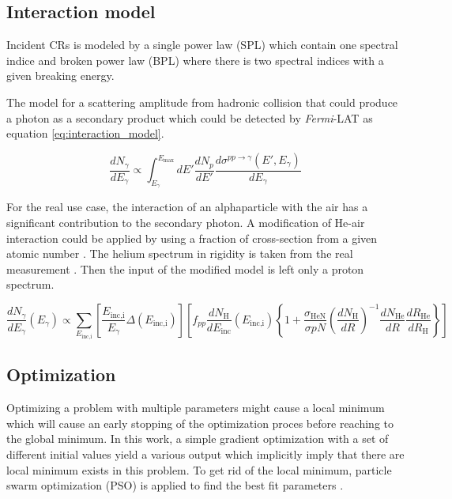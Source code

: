 \subsection{Interaction model}
Incident CRs is modeled by a single power law (SPL) which contain one
spectral indice and broken power law (BPL) where there is two spectral
indices with a given breaking energy.

The model for a scattering amplitude from hadronic collision \cite{K&Omodel}
that could produce a photon as a secondary product which could be
detected by \textit{Fermi}-LAT as equation \ref{eq:interaction_model}.

\begin{equation}
    \frac{dN_\gamma}{dE_\gamma}\propto \int^{E_{\text{max}}}_{E_\gamma} dE'\frac{dN_p}{dE'} \frac{d\sigma^{pp\rightarrow\gamma}(E',E_\gamma)}{dE_\gamma}
    \label{eq:interaction_model}
\end{equation}

For the real use case, the interaction of an alphaparticle with the air
has a significant contribution to the secondary photon.
A modification of He-air interaction could be
applied by using a fraction of cross-section from a given atomic number
\cite{WAtwater}. The helium spectrum in rigidity is taken from the real
measurement \cite{AMS-02Helium}. Then the input of the modified model
is left only a proton spectrum.

\begin{equation}
    \frac{dN_{\gamma}}{dE_\gamma}(E_\gamma) \propto \sum_{E_{\text{inc,i}}}\left[\frac{E_{\text{inc,i}}}{E_{\gamma}}\Delta(E_{\text{inc,i}}) \right]\left[ f_{pp}\frac{dN_\text{H}}{dE_{\text{inc}}}(E_{\text{inc,i}})\left\{ 1+\frac{\sigma_{\text{HeN}}}{\sigma{pN}}\left(\frac{dN_{\text{H}}}{dR}\right)^{-1} \frac{dN_{\text{He}}}{dR} \frac{dR_{\text{He}}}{dR_{\text{H}}}  \right\}\right]
\end{equation}


\subsection{Optimization}
Optimizing a problem with multiple parameters might cause a local minimum
which will cause an early stopping of the optimization proces before 
reaching to the global minimum. In this work, a simple gradient optimization
with a set of different initial values yield a various output which implicitly
imply that there are local minimum exists in this problem. 
To get rid of the local minimum, particle swarm optimization (PSO) is applied
to find the best fit parameters \cite{pso_optimize}.




